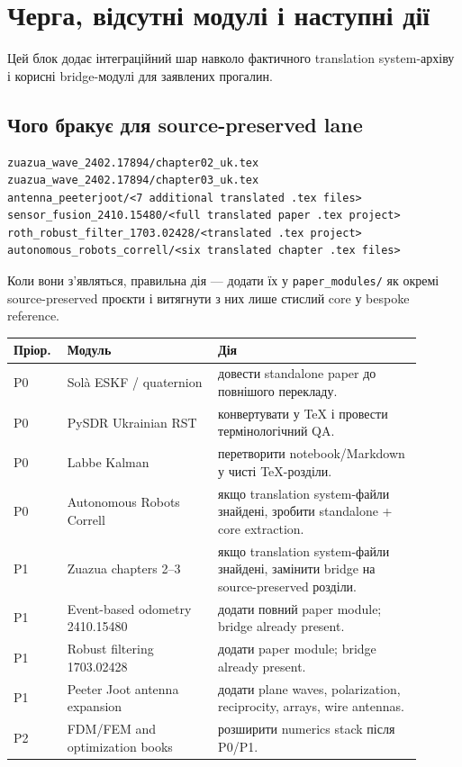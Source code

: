 \chapter{Черга, відсутні модулі і наступні дії}
\label{chap:session06-queue}

Цей блок додає інтеграційний шар навколо фактичного translation system-архіву і корисні bridge-модулі для заявлених прогалин.

\section{Чого бракує для source-preserved lane}

\begin{lstlisting}
zuazua_wave_2402.17894/chapter02_uk.tex
zuazua_wave_2402.17894/chapter03_uk.tex
antenna_peeterjoot/<7 additional translated .tex files>
sensor_fusion_2410.15480/<full translated paper .tex project>
roth_robust_filter_1703.02428/<translated .tex project>
autonomous_robots_correll/<six translated chapter .tex files>
\end{lstlisting}

Коли вони з'являться, правильна дія --- додати їх у \verb|paper_modules/| як окремі source-preserved проєкти і витягнути з них лише стислий core у bespoke reference.

\begin{longtable}{L{0.10\linewidth}L{0.34\linewidth}L{0.46\linewidth}}
\toprule
Пріор. & Модуль & Дія \\
\midrule
\endhead
P0 & Solà ESKF / quaternion & довести standalone paper до повнішого перекладу. \\
P0 & PySDR Ukrainian RST & конвертувати у TeX і провести термінологічний QA. \\
P0 & Labbe Kalman & перетворити notebook/Markdown у чисті TeX-розділи. \\
P0 & Autonomous Robots Correll & якщо translation system-файли знайдені, зробити standalone + core extraction. \\
P1 & Zuazua chapters 2--3 & якщо translation system-файли знайдені, замінити bridge на source-preserved розділи. \\
P1 & Event-based odometry 2410.15480 & додати повний paper module; bridge already present. \\
P1 & Robust filtering 1703.02428 & додати paper module; bridge already present. \\
P1 & Peeter Joot antenna expansion & додати plane waves, polarization, reciprocity, arrays, wire antennas. \\
P2 & FDM/FEM and optimization books & розширити numerics stack після P0/P1. \\
\bottomrule
\end{longtable}

